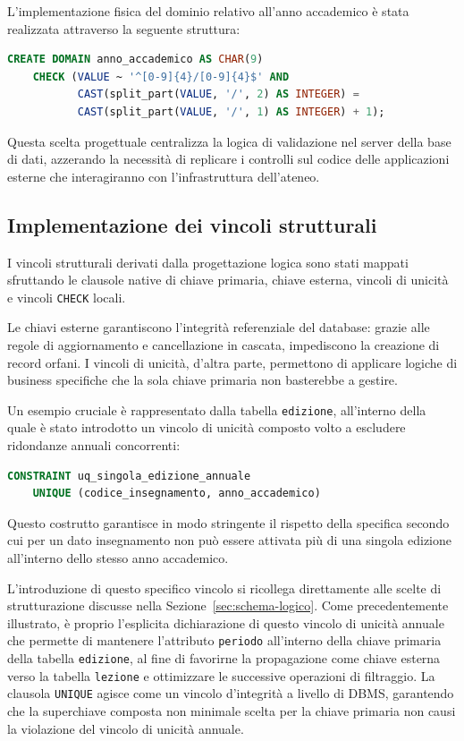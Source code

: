 L'implementazione fisica del dominio relativo all'anno accademico è stata realizzata attraverso la seguente struttura:

\begin{lstlisting}[language=SQL]
CREATE DOMAIN anno_accademico AS CHAR(9)
    CHECK (VALUE ~ '^[0-9]{4}/[0-9]{4}$' AND
           CAST(split_part(VALUE, '/', 2) AS INTEGER) =
           CAST(split_part(VALUE, '/', 1) AS INTEGER) + 1);
\end{lstlisting}

Questa scelta progettuale centralizza la logica di validazione nel server della base di dati, azzerando la necessità di replicare i controlli sul codice delle applicazioni esterne che interagiranno con l'infrastruttura dell'ateneo.

\subsection{Implementazione dei vincoli strutturali}
\label{ssec:implementazione-dei-vincoli-strutturali}

I vincoli strutturali derivati dalla progettazione logica sono stati mappati sfruttando le clausole native di chiave primaria, chiave esterna, vincoli di unicità e vincoli \texttt{CHECK} locali.

Le chiavi esterne garantiscono l'integrità referenziale del database: grazie alle regole di aggiornamento e cancellazione in cascata, impediscono la creazione di record orfani. I vincoli di unicità, d'altra parte, permettono di applicare logiche di business specifiche che la sola chiave primaria non basterebbe a gestire.

Un esempio cruciale è rappresentato dalla tabella \texttt{edizione}, all'interno della quale è stato introdotto un vincolo di unicità composto volto a escludere ridondanze annuali concorrenti:

\begin{lstlisting}[language=SQL]
CONSTRAINT uq_singola_edizione_annuale
    UNIQUE (codice_insegnamento, anno_accademico)
\end{lstlisting}

Questo costrutto garantisce in modo stringente il rispetto della specifica secondo cui per un dato insegnamento non può essere attivata più di una singola edizione all'interno dello stesso anno accademico.

L'introduzione di questo specifico vincolo si ricollega direttamente alle scelte di strutturazione discusse nella Sezione~\ref{sec:schema-logico}.
Come precedentemente illustrato, è proprio l'esplicita dichiarazione di questo vincolo di unicità annuale che permette di mantenere l'attributo \texttt{periodo} all'interno della chiave primaria della tabella \texttt{edizione}, al fine di favorirne la propagazione come chiave esterna verso la tabella \texttt{lezione} e ottimizzare le successive operazioni di filtraggio.
La clausola \texttt{UNIQUE} agisce come un vincolo d'integrità a livello di DBMS, garantendo che la superchiave composta non minimale scelta per la chiave primaria non causi la violazione del vincolo di unicità annuale.

